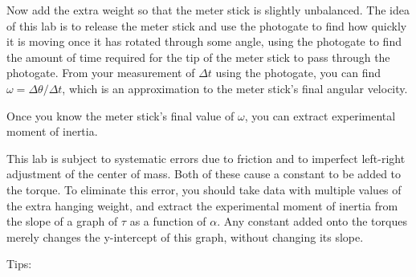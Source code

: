 \observations

Now add the extra weight so that the meter stick is slightly
unbalanced.  The idea of this lab is to release the meter
stick and use the photogate to find how quickly it is moving
once it has rotated through some angle, using the photogate
to find the amount of time required for the tip of the meter
stick to pass through the photogate.  From your measurement
of $\Delta t$ using the photogate, you can find $\omega=\Delta \theta/\Delta t$, 
which is an approximation to the meter
stick's final angular velocity.

Once you know the meter stick's final value of $\omega $,
you can extract experimental moment of inertia.

This lab is subject to systematic errors due to friction and to
imperfect left-right adjustment of the center of mass.
Both of these cause a constant to be added to the torque.
To eliminate this error, you should take data with multiple
values of the extra hanging weight, and extract the experimental
moment of inertia from the slope of a graph of $\tau$ as a function
of $\alpha$. Any constant added onto the torques merely changes
the y-intercept of this graph, without changing its slope.

Tips:


